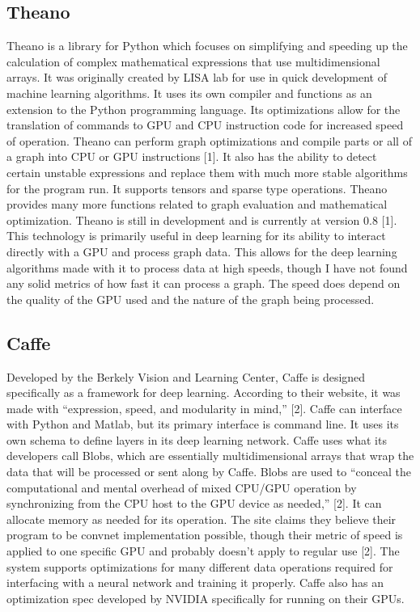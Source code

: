\documentclass{scrreprt}
\begin{document}
\subsection{Theano}
Theano is a library for Python which focuses on simplifying and speeding up the calculation of complex mathematical expressions that use multidimensional arrays. 
It was originally created by LISA lab for use in quick development of machine learning algorithms.
It uses its own compiler and functions as an extension to the Python programming language. 
Its optimizations allow for the translation of commands to GPU and CPU instruction code for increased speed of operation.
Theano can perform graph optimizations and compile parts or all of a graph into CPU or GPU instructions [1]. 
It also has the ability to detect certain unstable expressions and replace them with much more stable algorithms for the program run.
It supports tensors and sparse type operations. 
Theano provides many more functions related to graph evaluation and mathematical optimization. 
Theano is still in development and is currently at version 0.8 [1]. 
This technology is primarily useful in deep learning for its ability to interact directly with a GPU and process graph data. 
This allows for the deep learning algorithms made with it to process data at high speeds, though I have not found any solid metrics of how fast it can process a graph. 
The speed does depend on the quality of the GPU used and the nature of the graph being processed.

\subsection{Caffe}
Developed by the Berkely Vision and Learning Center, Caffe is designed specifically as a framework for deep learning. 
According to their website, it was made with “expression, speed, and modularity in mind,” [2]. 
Caffe can interface with Python and Matlab, but its primary interface is command line. 
It uses its own schema to define layers in its deep learning network.
Caffe uses what its developers call Blobs, which are essentially multidimensional arrays that wrap the data that will be processed or sent along by Caffe. 
Blobs are used to “conceal the computational and mental overhead of mixed CPU/GPU operation by synchronizing from the CPU host to the GPU device as needed,” [2]. 
It can allocate memory as needed for its operation.
The site claims they believe their program to be convnet implementation possible, though their metric of speed is applied to one specific GPU and probably doesn't apply to regular use [2]. 
The system supports optimizations for many different data operations required for interfacing with a neural network and training it properly.
Caffe also has an optimization spec developed by NVIDIA specifically for running on their GPUs.
\end{document}
